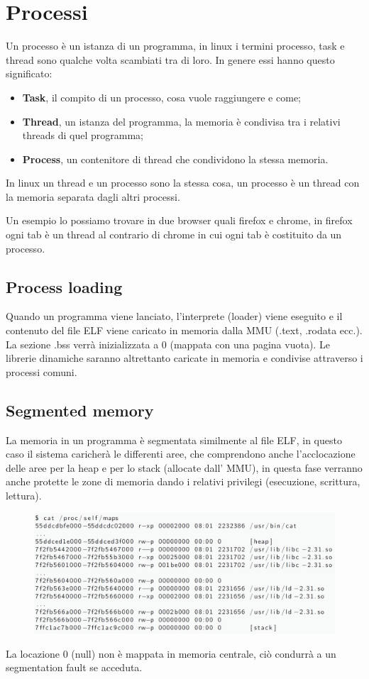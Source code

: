 \section{Processi}
Un processo è un istanza di un programma, in linux i termini processo, task e thread sono qualche volta scambiati tra di loro.
In genere essi hanno questo significato:
\begin{itemize}
    \item \textbf{Task}, il compito di un processo, cosa vuole raggiungere e come;
    \item \textbf{Thread}, un istanza del programma, la memoria è condivisa tra i relativi threads di quel programma;
    \item \textbf{Process}, un contenitore di thread che condividono la stessa memoria.
\end{itemize}
In linux un thread e un processo sono la stessa cosa, un processo è un thread con la memoria separata dagli altri processi.

Un esempio lo possiamo trovare in due browser quali firefox e chrome, in firefox ogni tab è un thread al contrario di chrome in cui ogni tab è costituito da un processo.

\subsection{Process loading}
Quando un programma viene lanciato, l'interprete (loader) viene eseguito e il contenuto del file ELF viene caricato in memoria dalla MMU (.text, .rodata ecc.). La sezione .bss verrà inizializzata a 0 (mappata con una pagina vuota).
Le librerie dinamiche saranno altrettanto caricate in memoria e condivise attraverso i processi comuni.

\subsection{Segmented memory}
La memoria in un programma è segmentata similmente al file ELF, in questo caso il sistema caricherà le differenti aree, che comprendono anche l'acclocazione delle aree per la heap e per lo stack (allocate dall' MMU), in questa fase verranno anche protette le zone di memoria dando i relativi privilegi (esecuzione, scrittura, lettura).
\begin{figure}[h!]
    \centering
    \includegraphics[width=.5\linewidth]{res/segmentation_memory.png}
    \caption{}
\end{figure}
\begin{lema}[]{}{}
    La locazione 0 (null) non è mappata in memoria centrale, ciò condurrà a un segmentation fault se acceduta.
\end{lema}

